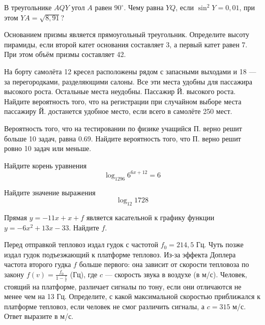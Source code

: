 \documentclass[twocolumn]{article}
\begin{document}
\cleardoublepage
\def\examvart{Вариант 19.3}
\normalsize

\startpartone
\large




\begin{taskBN}{1}
В треугольнике $AQY$ угол $A$ равен $90^\circ$. Чему равна  $YQ$, если $\sin^2{Y}=0,01$, при этом  $YA=\sqrt{8,91}$? 
\end{taskBN}

\begin{taskBN}{2}
Основанием призмы является  прямоугольный треугольник. Определите высоту пирамиды, если второй катет основания составляет 3, а первый катет равен 7. При этом объём призмы составляет 42. 
\end{taskBN}

\begin{taskBN}{3}
На борту самолёта 12 кресел расположены рядом с запасными выходами и 18 — за перегородками, разделяющими салоны. Все эти места удобны для пассажира высокого роста. Остальные места неудобны. Пассажир Й. высокого роста. Найдите вероятность того, что на регистрации при случайном выборе места пассажиру Й. достанется удобное место, если всего в самолёте 250 мест.
\end{taskBN}

\begin{taskBN}{4}
Вероятность того, что на тестировании по физике учащийся П. верно решит больше 10 задач, равна 0.69. Найдите вероятность того, что П. верно решит ровно 10 задач  или меньше.
\end{taskBN}

\begin{taskBN}{5}
Найдите корень уравнения $$\log_{1296}{6^{6x+12}}=6$$
\end{taskBN}

\begin{taskBN}{6}
Найдите значение выражения $$ \log_{12}1728 $$
\end{taskBN}

\begin{taskBN}{7}
Прямая $y=-11x+x+f$ является касательной к графику функции $y=-6x^{2}+13x-33$. Найдите $f$.
\end{taskBN}

\begin{taskBN}{8}
Перед отправкой тепловоз издал гудок с частотой $f_0 = 214,5$ Гц. Чуть позже издал гудок подъезжающий к платформе тепловоз. Из-за эффекта Доплера частота второго гудка $f$ больше первого: она зависит от скорости тепловоза по закону $f(v)=\frac{f_0}{1-\frac{v}{c}}$ (Гц), где $c$ — скорость звука в воздухе (в м/с). Человек, стоящий на платформе, различает сигналы по тону, если они отличаются не менее чем на 13 Гц. Определите, с какой максимальной скоростью приближался к платформе тепловоз, если человек не смог различить сигналы, а $c = 315$ м/с. Ответ выразите в м/с.
\end{taskBN}
\end{document}
